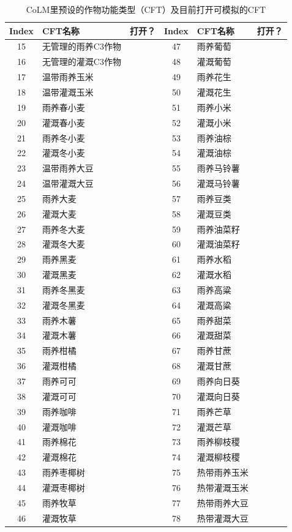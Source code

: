 {
\begin{table}[htbp]
\centering
  \caption{CoLM里预设的作物功能类型（CFT）及目前打开可模拟的CFT}
  \label{tab:CoLM预设作物功能类型}
  \begin{tabular}{@{}clc|clc@{}}
  \toprule
  Index	& CFT名称	& 打开？&	Index	& CFT名称	& 打开？\\
  \midrule
  15 &	无管理的雨养C3作物	 &   &	47	& 雨养葡萄	&  \\
  16 &	无管理的灌溉C3作物	 &  &	48 &	灌溉葡萄	&  \\
  17 &	温带雨养玉米	& \checkmark &	49	& 雨养花生 & \\	
  18 &  温带灌溉玉米	& \checkmark &	50	& 灌溉花生 & \\	
  19 &  雨养春小麦	& \checkmark & 51	& 雨养小米  & \\
  20 &  灌溉春小麦	& \checkmark & 52	& 灌溉小米  & \\
  21 & 雨养冬小麦	& \checkmark & 53	& 雨养油棕  & \\
  22 & 灌溉冬小麦	& \checkmark & 54	& 灌溉油棕  & \\
  23 & 温带雨养大豆	& \checkmark & 55	& 雨养马铃薯	& \\
  24 & 温带灌溉大豆	& \checkmark & 56	& 灌溉马铃薯	& \\
  25 & 雨养大麦 & 	& 57 &	雨养豆类	& \\
  26 & 灌溉大麦 &  & 58 &	灌溉豆类	& \\
  27 & 雨养冬大麦 &	 & 59 & 雨养油菜籽 & \\	
  28 & 灌溉冬大麦 &	 & 60 & 灌溉油菜籽 & \\	
  29 & 雨养黑麦 & 	& 61 &	雨养水稻	& \checkmark \\
  30 & 灌溉黑麦 & 	& 62 &	灌溉水稻	& \checkmark \\
  31 & 雨养冬黑麦 &	 &	63 & 雨养高粱 & \\
  32 & 灌溉冬黑麦 &	 &	64 & 灌溉高粱 & \\
  33 & 雨养木薯 &	 &	65 & 雨养甜菜 & \\
  34 & 灌溉木薯 &	 &	66 & 灌溉甜菜 & \\
  35 & 雨养柑橘 &	 &  67 & 雨养甘蔗 & \\	
  36 & 灌溉柑橘 &   &	68 & 灌溉甘蔗 & \\	
  37 & 雨养可可 &	 &	69 & 雨养向日葵 &	\\
  38 & 灌溉可可 &   &	70 & 灌溉向日葵 & \\
  39 & 雨养咖啡 &   &	71 & 雨养芒草 & \\
  40 & 灌溉咖啡 &   &	72 & 灌溉芒草 & \\
  41 & 雨养棉花 &	 &  73 & 雨养柳枝稷 & \\	
  42 & 灌溉棉花 &	 &  74 & 灌溉柳枝稷 & \\
  43 & 雨养枣椰树 &  &	75 & 热带雨养玉米	& \checkmark \\
  44 & 灌溉枣椰树 &  &	76 & 热带灌溉玉米	& \checkmark \\
  45 & 雨养牧草 &   &	77 & 热带雨养大豆	& \checkmark \\
  46 & 灌溉牧草 &   &	78 & 热带灌溉大豆	& \checkmark \\
  \bottomrule
  \end{tabular}
\end{table}
}

